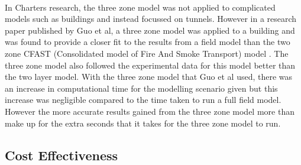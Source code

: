 \documentclass[table,a4paper,oneside]{book}
\begin{document}
\\
In Charters research, the three zone model was not applied to complicated models such as buildings and instead focussed on tunnels. However in a research paper published by Guo et al, a three zone model was applied to a building and was found to provide a closer fit to the results from a field model than the two zone CFAST (Consolidated model of Fire And Smoke Transport) model \citep{Guo2009}. The three zone model also followed the experimental data for this model better than the two layer model. With the three zone model that Guo et al used, there was an increase in computational time for the modelling scenario given but this increase was negligible compared to the time taken to run a full field model. However the more accurate results gained from the three zone model more than make up for the extra seconds that it takes for the three zone model to run.
\subsection{Cost Effectiveness}
\end{document}
